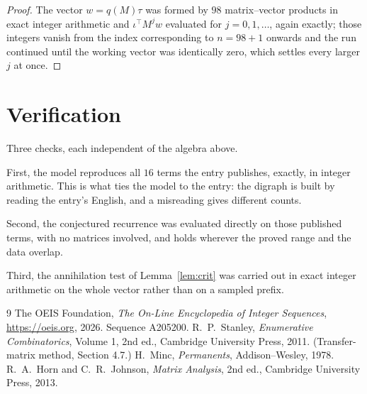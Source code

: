 \documentclass[11pt,a4paper]{article}
\theoremstyle{plain}
\theoremstyle{definition}
\begin{document}
\begin{proof}
The vector $w=q(M)\tau$ was formed by $98$ matrix--vector products in exact integer
arithmetic and $\iota^{\!\top}M^{j}w$ evaluated for $j=0,1,\dots$, again exactly; those
integers vanish from the index corresponding to $n=98+1$ onwards and the run continued
until the working vector was identically zero, which settles every larger $j$ at once.
\end{proof}

\section{Verification}

Three checks, each independent of the algebra above.

First, the model reproduces all $16$ terms the entry publishes, exactly, in integer
arithmetic. This is what ties the model to the entry: the digraph is built by reading the
entry's English, and a misreading gives different counts.

Second, the conjectured recurrence was evaluated directly on those published terms, with no
matrices involved, and holds wherever the proved range and the data overlap.

Third, the annihilation test of Lemma~\ref{lem:crit} was carried out in exact integer
arithmetic on the whole vector rather than on a sampled prefix.

\begin{thebibliography}{9}
 The OEIS Foundation, \emph{The On-Line Encyclopedia of Integer
Sequences}, \url{https://oeis.org}, 2026. Sequence A205200.
 R.~P.~Stanley, \emph{Enumerative Combinatorics}, Volume 1, 2nd ed.,
Cambridge University Press, 2011. (Transfer-matrix method, Section 4.7.)
 H.~Minc, \emph{Permanents}, Addison--Wesley, 1978.
 R.~A.~Horn and C.~R.~Johnson, \emph{Matrix Analysis}, 2nd ed., Cambridge
University Press, 2013.
\end{thebibliography}
\end{document}

